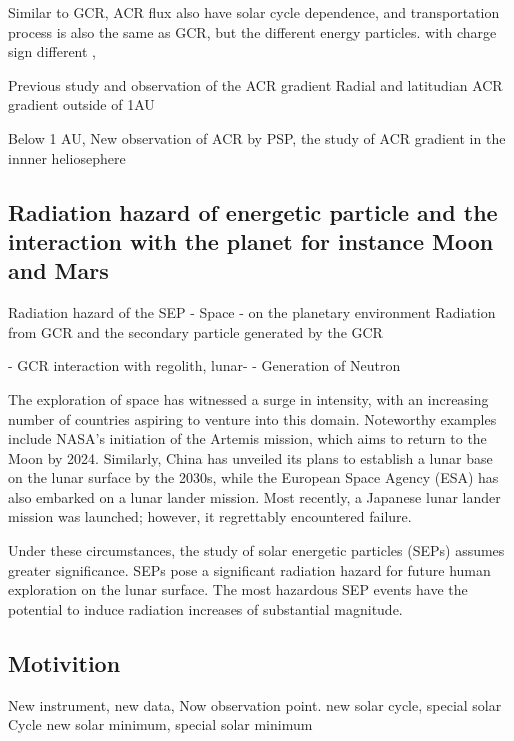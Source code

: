 Similar to GCR, ACR flux also have solar cycle dependence, and transportation process is also the same as GCR, but the different energy particles.
with charge sign different
,

Previous study and observation of the ACR gradient
	Radial and latitudian ACR gradient outside of 1AU

	Below 1 AU, New observation of ACR by PSP, the study of ACR gradient in the innner heliosephere


\subsection{Radiation hazard of energetic particle and the interaction with the planet for instance Moon and Mars}

Radiation hazard of the SEP 
- Space
- on the planetary environment
Radiation from GCR and the secondary particle generated by the GCR

- GCR interaction with regolith, lunar-
	- Generation of Neutron

The exploration of space has witnessed a surge in intensity, with an increasing number of countries aspiring to venture into this domain. Noteworthy examples include NASA's initiation of the Artemis mission, which aims to return to the Moon by 2024. Similarly, China has unveiled its plans to establish a lunar base on the lunar surface by the 2030s, while the European Space Agency (ESA) has also embarked on a lunar lander mission. Most recently, a Japanese lunar lander mission was launched; however, it regrettably encountered failure.

Under these circumstances, the study of solar energetic particles (SEPs) assumes greater significance. SEPs pose a significant radiation hazard for future human exploration on the lunar surface. The most hazardous SEP events have the potential to induce radiation increases of substantial magnitude.

\subsection{Motivition}
New instrument, new data, 
Now observation point.
new solar cycle, special solar Cycle
new solar minimum, special solar minimum
